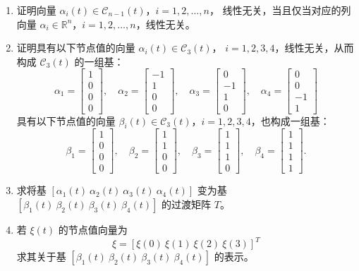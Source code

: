 \documentclass[UTF8,10pt,letterpaper,fontset=fandol]{ctexart}
\newcommand{\R}{\mathbb R}
\begin{document}
\begin{enumerate}
\item 证明向量 \(\alpha_i(t)\in\mathcal C_{n-1}(t)\)，\(i=1,2,\ldots,n\)，
线性无关，当且仅当对应的列向量 \(\alpha_i\in\R^n\)，\(i=1,2,\ldots,n\)，线性无关。
\item 证明具有以下节点值的向量 \(\alpha_i(t)\in\mathcal C_3(t)\)，
\(i=1,2,3,4\)，线性无关，从而构成 \(\mathcal C_3(t)\) 的一组基：
\[
\alpha_1=\begin{bmatrix}1\\0\\0\\0\end{bmatrix},\quad
\alpha_2=\begin{bmatrix}-1\\1\\0\\0\end{bmatrix},\quad
\alpha_3=\begin{bmatrix}0\\-1\\1\\0\end{bmatrix},\quad
\alpha_4=\begin{bmatrix}0\\0\\-1\\1\end{bmatrix}
\]
具有以下节点值的向量 \(\beta_i(t)\in\mathcal C_3(t)\)，\(i=1,2,3,4\)，也构成一组基：
\[
\beta_1=\begin{bmatrix}1\\0\\0\\0\end{bmatrix},\quad
\beta_2=\begin{bmatrix}1\\1\\0\\0\end{bmatrix},\quad
\beta_3=\begin{bmatrix}1\\1\\1\\0\end{bmatrix},\quad
\beta_4=\begin{bmatrix}1\\1\\1\\1\end{bmatrix}.
\]
\item 求将基 \([\alpha_1(t)\ \alpha_2(t)\ \alpha_3(t)\ \alpha_4(t)]\)
变为基 \([\beta_1(t)\ \beta_2(t)\ \beta_3(t)\ \beta_4(t)]\) 的过渡矩阵 \(T\)。
\item 若 \(\xi(t)\) 的节点值向量为
\[
\xi=[\xi(0)\ \xi(1)\ \xi(2)\ \xi(3)]^T
\]
求其关于基 \([\beta_1(t)\ \beta_2(t)\ \beta_3(t)\ \beta_4(t)]\) 的表示。
\end{enumerate}
\end{document}
